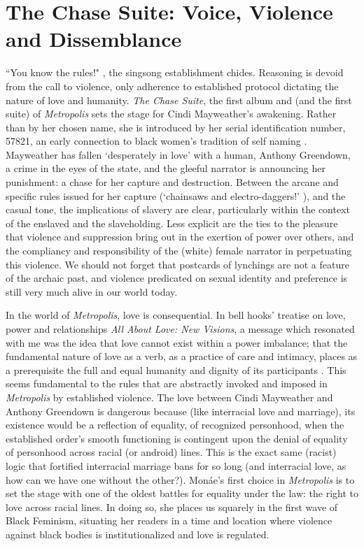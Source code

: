 \documentclass[a4paper, 11pt]{article} %
\begin{document}

\section*{The Chase Suite: Voice, Violence and Dissemblance}

``You know the rules!" \cite{wolfmasters}, the singsong establishment chides.
Reasoning is devoid from the call to violence, only adherence to established protocol dictating the nature of love and humanity.
\emph{The Chase Suite}, the first album and (and the first suite) of \emph{Metropolis} sets the stage for Cindi Mayweather's awakening.
Rather than by her chosen name, she is introduced by her serial identification number, 57821, an early connection to black women's tradition of self naming \cite{selfnaming}.
Mayweather has fallen `desperately in love' with a human, Anthony Greendown, a crime in the eyes of the state, and the gleeful narrator is announcing her punishment: a chase for her capture and destruction.
Between the arcane and specific rules issued for her capture (`chainsaws and electro-daggers!' \cite{wolfmasters}), and the casual tone, the implications of slavery are clear, particularly within the context of the enslaved and the slaveholding. 
Less explicit are the ties to the pleasure that violence and suppression bring out in the exertion of power over others, and the compliancy and responsibility of the (white) female narrator in perpetuating this violence.
We should not forget that postcards of lynchings are not a feature of the archaic past, and violence predicated on sexual identity and preference is still very much alive in our world today.

In the world of \emph{Metropolis}, love is consequential.
In bell hooks' treatise on love, power and relationships \emph{All About Love: New Visions}, a message which resonated with me was the idea that love cannot exist within a power imbalance; that the fundamental nature of love as a verb, as a practice of care and intimacy, places as a prerequisite the full and equal humanity and dignity of its participants \cite{newvisions}. 
This seems fundamental to the rules that are abstractly invoked and imposed in \emph{Metropolis} by established violence. 
The love between Cindi Mayweather  and Anthony Greendown is dangerous because (like interracial love and marriage), its existence would be a reflection of equality, of recognized personhood, when the established order's smooth functioning is contingent upon the denial of equality of personhood across racial (or android) lines. 
This is the exact same (racist) logic that fortified interracial marriage bans for so long (and interracial love, as how can we have one without the other?).
Mon\'ae's first choice in \emph{Metropolis} is to set the stage with one of the oldest battles for equality under the law: the right to love across racial lines.
In doing so, she places us squarely in the first wave of Black Feminism, situating her readers in a time and location where violence against black bodies is institutionalized and love is regulated.
\end{document}
